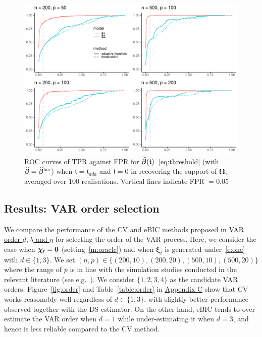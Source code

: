 \begin{figure}[htb!]
\centering
\includegraphics[width = .8\textwidth]{figs/threshomega.pdf}
\caption{\small ROC curves of TPR against FPR for $\widetilde{\bm\beta}(\mathfrak{t})$~\eqref{eq:threshold} (with $\widehat{\bm\beta} = \widehat{\bm\beta}^{\text{\upshape{las}}}$) when $\mathfrak{t} =\mathfrak{t}_{ada}$ and $\mathfrak{t} = 0$ in recovering the support of $\bm\Omega$, averaged over $100$ realisations.
Vertical lines indicate FPR $= 0.05$ }
\label{fig:sim:omegathresh}
\end{figure}

\subsection{Results: VAR order selection}
\label{sec:sim:order}
 
We compare the performance of the CV and eBIC methods proposed in \hyperref[sec:order:lambda]{VAR order $d, \lambda$ and $\eta$} for selecting the order of the VAR process.
Here, we consider the case when $\bm\chi_t = \mathbf 0$ (setting~\ref{m:oracle}) and when $\bm\xi_t$ is generated under~\ref{e:one} with $d \in \{1, 3\}$. 
We set $(n, p) \in \{(200, 10), (200, 20), (500, 10), (500, 20)\}$ where the range of $p$ is in line with the simulation studies conducted in the relevant literature (see e.g.\ \cite{zheng2022interpretable}).
We consider $\{1, 2, 3, 4\}$ as the candidate VAR orders.
Figure~\ref{fig:order} and Table~\ref{table:order} in \hyperref[sec:appendix:sim]{Appendix C} show that CV works reasonably well regardless of $d \in \{1, 3\}$, with slightly better performance observed together with the DS estimator.
On the other hand, eBIC tends to over-estimate the VAR order when $d = 1$ while under-estimating it when $d = 3$, and hence is less reliable compared to the CV method. 

